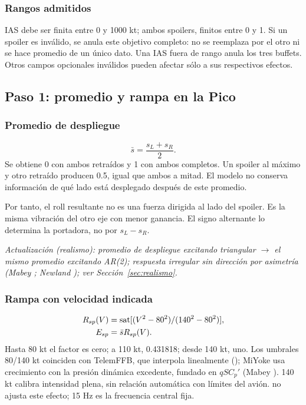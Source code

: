 \subsubsection{Rangos admitidos}
IAS debe ser finita entre 0 y 1000 kt; ambos spoilers, finitos entre 0 y 1. Si un spoiler es inválido, se anula este objetivo completo: no se reemplaza por el otro ni se hace promedio de un único dato. Una IAS fuera de rango anula los tres buffets. Otros campos opcionales inválidos pueden afectar sólo a sus respectivos efectos.

\subsection{Paso 1: promedio y rampa en la Pico}
\subsubsection{Promedio de despliegue}
\begin{equation}
\bar s=\frac{s_L+s_R}{2}.
\end{equation}
Se obtiene 0 con ambos retraídos y 1 con ambos completos. Un spoiler al máximo y otro retraído producen 0.5, igual que ambos a mitad. El modelo no conserva información de qué lado está desplegado después de este promedio.

Por tanto, el roll resultante no es una fuerza dirigida al lado del spoiler. Es la misma vibración del otro eje con menor ganancia. El signo alternante lo determina la portadora, no por $s_L-s_R$.

\textit{Actualización (realismo): promedio de despliegue excitando triangular $\rightarrow$ el mismo promedio excitando AR(2); respuesta irregular sin dirección por asimetría (Mabey \cite{mabey1988}; Newland \cite{newland1993}); ver Sección~\ref{sec:realismo}.}

\subsubsection{Rampa con velocidad indicada}
\begin{align}
R_{sp}(V)&=\operatorname{sat}[(V^2-80^2)/(140^2-80^2)],\\
E_{sp}&=\bar s R_{sp}(V).
\label{eq:spoiler-env}
\end{align}
Hasta 80 kt el factor es cero; a 110 kt, 0.431818; desde 140 kt, uno. Los umbrales 80/140 kt coinciden con TelemFFB, que interpola linealmente (); MiYoke usa crecimiento con la presión dinámica excedente, fundado en $qSC_p'$ (Mabey \cite{mabey1988}). 140 kt calibra intensidad plena, sin relación automática con límites del avión.  no ajusta este efecto; 15 Hz es la frecuencia central fija.

